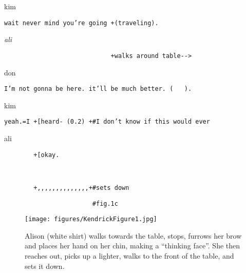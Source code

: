 \documentclass[output=paper,nonflat,modfont,draft]{langsci/langscibook}
\begin{document}
\begin{transbox}{15}{kim}
\begin{verbatim}
wait never mind you’re going +(traveling).
\end{verbatim}
\end{transbox}

\begin{transbox}{16}{\textit{ali}}
\begin{verbatim}
                             +walks around table-->
\end{verbatim}
\end{transbox}


\begin{transbox}{18}{don}
\begin{verbatim}
I’m not gonna be here. it’ll be much better. (   ).
\end{verbatim}
\end{transbox}


\begin{transbox}{20}{kim}
\begin{verbatim}
yeah.=I +[heard- (0.2) +#I don’t know if this would ever
\end{verbatim}
\end{transbox}

\begin{transbox}{21}{ali}
\begin{verbatim}
        +[okay.
\end{verbatim}
\end{transbox}

\begin{transbox}{22}{~}
\begin{verbatim}
        +,,,,,,,,,,,,,,+#sets down
\end{verbatim}
\end{transbox}

\begin{transbox}{23}{\fig}
\begin{verbatim}
                        #fig.1c
\end{verbatim}
\end{transbox}\bigskip

\begin{figure}
\caption{Alison (white shirt) walks towards the table, stops, furrows her brow and places her hand on her chin, making a “thinking face”. She then reaches out, picks up a lighter, walks to the front of the table, and sets it down. }
\texttt{[image: figures/KendrickFigure1.jpg]}
\label{fig:kendrick:1}
\end{figure}
\end{document}
